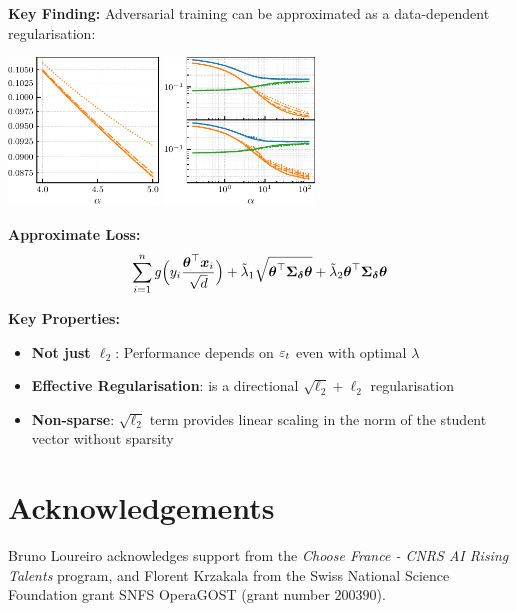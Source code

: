 \documentclass[a0paper,fleqn]{betterportraitposter}
\theoremstyle{plain}
\theoremstyle{definition}
\theoremstyle{remark}
\begin{document}
{\begin{multicols}{3}
\textbf{Key Finding:} Adversarial training can be approximated as a data-dependent regularisation:

\begin{center}
\includegraphics[width=0.3\textwidth]{Assets/gen_lambda_optimal_sweep_alpha.pdf}
\includegraphics[width=0.3\textwidth]{Assets/effective_regularisation.pdf}
\end{center}

\textbf{Approximate Loss:}
\begin{equation}
    \sum_{i = 1}^{n} 
    g \Big( y_{i} \frac{\boldsymbol{\theta}^\top \boldsymbol{x}_{i}}{\sqrt{d}} \Big) 
    + \tilde{\lambda}_1 \sqrt{\boldsymbol{\theta}^\top \boldsymbol{\Sigma}_{\boldsymbol{\delta}} \boldsymbol{\theta}} + \tilde{\lambda}_2 \boldsymbol{\theta}^\top \boldsymbol{\Sigma}_{\boldsymbol{\delta}} \boldsymbol{\theta}
\end{equation}

\textbf{Key Properties:}
\begin{itemize}
    \item \textbf{Not just $\ell_2$}: Performance depends on $\varepsilon_t$ even with optimal $\lambda$
    \item \textbf{Effective Regularisation}: is a directional \(\sqrt{\ell_2} + \ell_2\) regularisation
    \item \textbf{Non-sparse}: $\sqrt{\ell_2}$ term provides linear scaling in the norm of the student vector without sparsity
\end{itemize}

\section{Acknowledgements}

Bruno Loureiro acknowledges support from the \textit{Choose France - CNRS AI Rising Talents} program, and Florent Krzakala from the Swiss National Science Foundation grant SNFS OperaGOST  (grant number $200390$).

\end{multicols}
}
\end{document}
